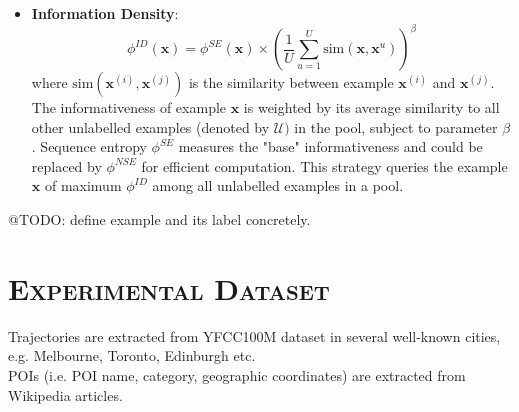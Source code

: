 \documentclass[11pt, a4paper]{article}
\begin{document}
\begin{itemize}
\item \textbf{Information Density}\cite{settles08}:
      \begin{equation*}
      \phi^{ID}(\textbf{x}) = \phi^{SE}(\textbf{x}) \times 
        \left(
        \frac{1}{U} \sum_{u=1}^U \text{sim}(\textbf{x}, \textbf{x}^u)
        \right)^\beta
      \end{equation*}
      where $\text{sim}(\textbf{x}^{(i)}, \textbf{x}^{(j)})$ is the similarity between example $\textbf{x}^{(i)}$ and $\textbf{x}^{(j)}$.
      The informativeness of example $\textbf{x}$ is weighted by its average similarity 
      to all other unlabelled examples (denoted by $\mathcal{U})$ in the pool, subject to parameter $\beta$.
      Sequence entropy $\phi^{SE}$ measures the "base" informativeness and could be replaced by $\phi^{NSE}$ for efficient computation.
      This strategy queries the example $\textbf{x}$ of maximum $\phi^{ID}$ among all unlabelled examples in a pool.
\end{itemize}
@TODO: define example and its label concretely.

\section{\textsc{Experimental Dataset}}
Trajectories are extracted from YFCC100M dataset in several well-known cities, e.g. Melbourne, Toronto, Edinburgh etc. \\
POIs (i.e. POI name, category, geographic coordinates) are extracted from Wikipedia articles.




\end{document}
